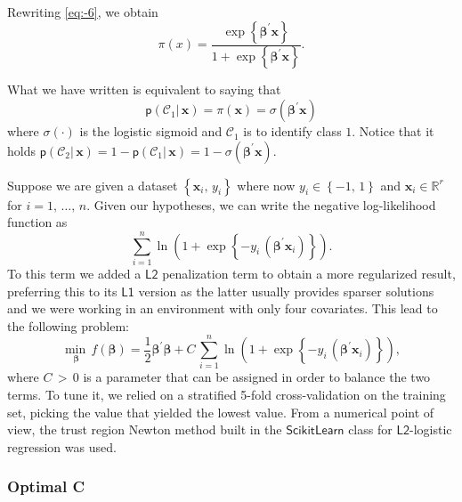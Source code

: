 \documentclass[a4paper]{article}
\begin{document}
Rewriting \ref{eq:-6}, we obtain
\begin{equation}
\pi\left(x\right)=\frac{\exp\left\{ \mathbf{\beta}^{\prime}\mathbf{x}\right\} }{1+\exp\left\{ \mathbf{\beta}^{\prime}\mathbf{x}\right\} }.\label{eq:-5}
\end{equation}

What we have written is equivalent to saying that 
\begin{equation}
\mathsf{p}\left(\mathcal{C}_{1}|\,\mathbf{x}\right)=\pi\left(\mathbf{x}\right)=\sigma\left(\mathbf{\beta}^{\prime}\mathbf{x}\right)\label{eq:-7}
\end{equation}
where $\sigma\left(\cdot\right)$ is the logistic sigmoid and $\mathcal{C}_{1}$
is to identify class $1$. Notice that it holds $\mathsf{p}\left(\mathcal{C}_{2}|\,\mathbf{x}\right)=1-\mathsf{p}\left(\mathcal{C}_{1}|\,\mathbf{x}\right)=1-\sigma\left(\mathbf{\beta}^{\prime}\mathbf{x}\right)$.

Suppose we are given a dataset $\left\{ \mathbf{x}_{i},\,y_{i}\right\} $
where now $y_{i}\in\left\{ -1,\,1\right\} $ and $\mathbf{x}_{i}\in\mathbb{R}^{r}$
for $i=1,\,\ldots,\,n$. Given our hypotheses, we can write the negative
log-likelihood function as
\begin{equation}
\sum_{i=1}^{n}\ln\left(1+\exp\left\{ -y_{i}\,\left(\mathbf{\beta}^{\prime}\mathbf{x}_{i}\right)\right\} \right).\label{eq:-8}
\end{equation}
To this term we added a $\mathsf{L2}$ penalization term to obtain
a more regularized result, preferring this to its $\mathsf{L1}$ version
as the latter usually provides sparser solutions and we were working
in an environment with only four covariates. This lead to the following
problem:
\begin{equation}
\underset{\mathbf{\beta}}{\min\,}f\left(\mathbf{\beta}\right)=\frac{1}{2}\mathbf{\beta}^{\prime}\mathbf{\beta}+C\,\sum_{i=1}^{n}\ln\left(1+\exp\left\{ -y_{i}\,\left(\mathbf{\beta}^{\prime}\mathbf{x}_{i}\right)\right\} \right),\label{eq:-9}
\end{equation}
where $C\,>\,0$ is a parameter that can be assigned in order to balance
the two terms. To tune it, we relied on a stratified 5-fold cross-validation
on the training set, picking the value that yielded the lowest value.
From a numerical point of view, the trust region Newton method built
in the $\mathsf{ScikitLearn}$ class for $\mathsf{L2}$-logistic regression
was used.

\subsubsection{Optimal C}
\end{document}
